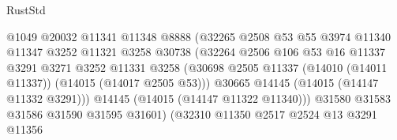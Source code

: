 \begin{lexlean}{RustStd}
\begin{coremodule}
                                          @1049
                                          @20032
                                          @11341
                                          @11348
                                          @8888
                                          (@32265
                                            @2508
                                            @53
                                            @55
                                            @3974
                                            @11340
                                            @11347
                                            @3252
                                            @11321
                                            @3258
                                            @30738
                                            (@32264
                                              @2506
                                              @106
                                              @53
                                              @16
                                              @11337
                                              @3291
                                              @3271
                                              @3252
                                              @11331
                                              @3258
                                              (@30698
                                                @2505
                                                @11337
                                                (@14010 (@14011 @11337))
                                                (@14015 (@14017 @2505 @53)))
                                              @30665
                                              @14145
                                              (@14015 (@14147 @11332 @3291)))
                                            @14145
                                            (@14015 (@14147 @11322 @11340)))
                                          @31580
                                          @31583
                                          @31586
                                          @31590
                                          @31595
                                          @31601)
                                        (@32310
                                          @11350
                                          @2517
                                          @2524
                                          @13
                                          @3291
                                          @11356

\end{coremodule}
\end{lexlean}
